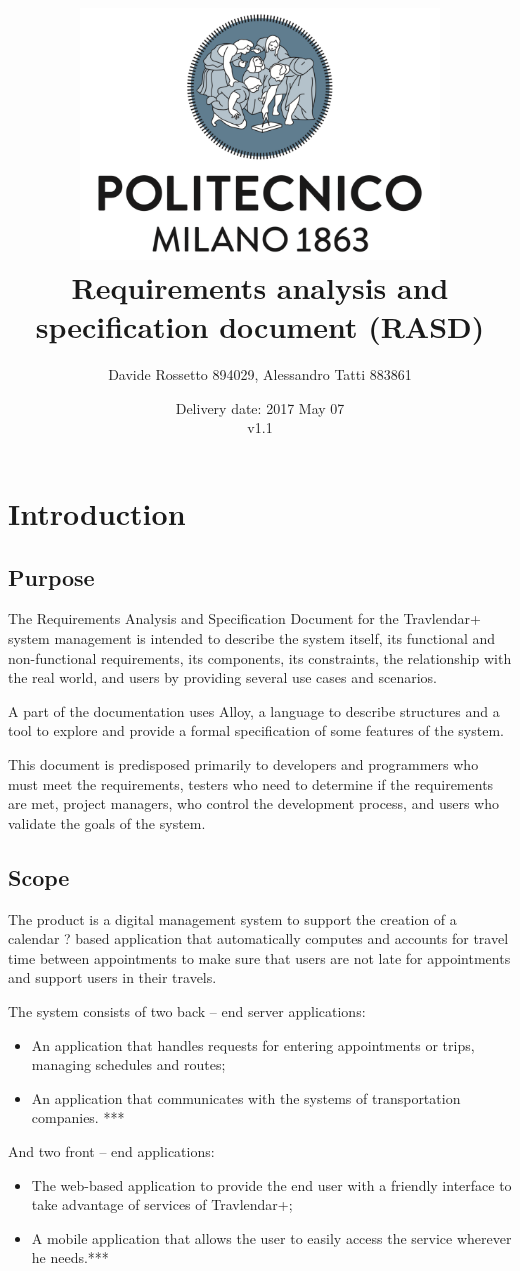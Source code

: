 \documentclass{report}
\title{ \includegraphics[width=95mm]{img/PolimiLogo.png}\\
	\bigskip \bigskip Requirements analysis and specification document (RASD)}
\author{Davide Rossetto 894029, Alessandro Tatti 883861}
\date{Delivery date: 2017 May 07\\
	\bigskip v1.1}
\begin{document}
	
\maketitle
\newpage
\tableofcontents
\newpage
	
	
	\chapter{Introduction}
	
	
	\section{Purpose}
	The Requirements Analysis and Specification Document for the Travlendar+ system management is intended to describe the system itself, its functional and non-functional requirements, its components, its constraints, the relationship with the real world, and users by providing several use cases and scenarios.	
	
	A part of the documentation uses Alloy, a language to describe structures and a tool to explore and provide a formal specification of some features of the system.
	
	\bigskip
	This document is predisposed primarily to developers and programmers who must meet the requirements, testers who need to determine if the requirements are met, project managers, who control the development process, and users who validate the goals of the system.
	
	
	\section{Scope}
	The product is a digital management system to support the creation of a calendar ? based application that automatically computes and accounts for travel time between appointments to make sure that users are not late for appointments and support users in their travels.

	\bigskip
	The system consists of two back -- end server applications:
	\begin{itemize}
	\item An application that handles requests for entering appointments or trips, managing schedules and routes;
	\item An application that communicates with the systems of transportation companies. ***
	\end{itemize}

	\bigskip
	And two front -- end applications:
	\begin{itemize}
	\item The web-based application to provide the end user with a friendly interface to take advantage of services of Travlendar+;
	\item A mobile application that allows the user to easily access the service wherever he needs.***
	\end{itemize}
\end{document}
